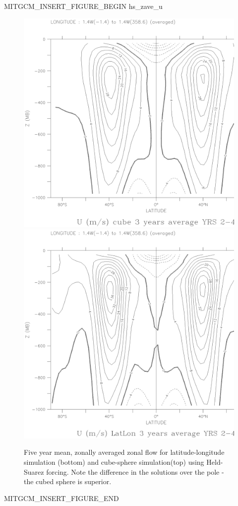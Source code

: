 \begin{rawhtml}MITGCM_INSERT_FIGURE_BEGIN hs_zave_u\end{rawhtml}
\begin{figure}
 \begin{center}
   \includegraphics*[width=.9\textwidth]{s_overview/figs/u_cube.ps}
   \includegraphics*[width=.9\textwidth]{s_overview/figs/u_latlon.ps}
 \end{center}
\caption{
Five year mean, zonally averaged zonal flow for
latitude-longitude simulation (bottom) and cube-sphere simulation(top) using
Held-Suarez forcing. Note the difference in the solutions over the pole -
the cubed sphere is superior.
}
\label{fig:hs_zave_u}
\end{figure}
\begin{rawhtml}MITGCM_INSERT_FIGURE_END \end{rawhtml}
